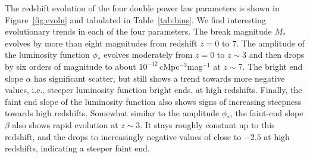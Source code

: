 \documentclass[fleqn,usenatbib]{mnras}
\begin{document}
The redshift evolution of the four double power law parameters is
shown in Figure~\ref{fig:evoln} and tabulated in Table~\ref{tab:bins}.
We find interesting evolutionary trends in each of the four
parameters.  The break magnitude $M_*$ evolves by more than eight
magnitudes from redshift $z=0$ to $7$.  The amplitude of the
luminosity function $\phi_*$ evolves moderately from $z=0$ to $z\sim
3$ and then drops by six orders of magnitude to about
$10^{-12}$\,cMpc$^{-3}$mag$^{-1}$ at $z\sim 7$.  The bright end slope
$\alpha$ has significant scatter,
but still shows a trend towards more
negative values, i.e., steeper luminosity function bright ends, at
high redshifts.  Finally, the faint end slope of the luminosity
function also shows signs of increasing steepness towards high
redshifts.
Somewhat similar to the amplitude $\phi_*$, the faint-end slope
$\beta$ also shows rapid evolution at $z\sim 3$.  It stays roughly
constant up to this redshift, and the drops to increasingly negative
values of close to $-2.5$ at high redshifts, indicating a steeper
faint end.



\end{document}

